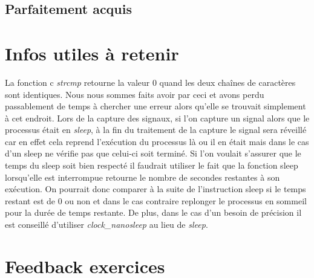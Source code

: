 \documentclass{ReportTemplate}
\begin{document}
\subsection{Parfaitement acquis}

\section{Infos utiles à retenir}
La fonction c \textit{strcmp} retourne la valeur 0 quand les deux chaînes de
caractères sont identiques. Nous nous sommes faits avoir par ceci et avons perdu
passablement de temps à chercher une erreur alors qu'elle se trouvait simplement
à cet endroit.\newline
Lors de la capture des signaux, si l'on capture un signal alors que le processus
était en \textit{sleep}, à la fin du traitement de la capture le signal sera
réveillé car en effet cela reprend l'exécution du processus là ou il en était
mais dans le cas d'un sleep ne vérifie pas que celui-ci soit terminé. Si l'on
voulait s'assurer que le temps du sleep soit bien respecté il faudrait utiliser
le fait que la fonction sleep lorsqu'elle est interrompue retourne le nombre de
secondes restantes à son exécution. On pourrait donc comparer à la suite de
l'instruction sleep si le temps restant est de 0 ou non et dans le cas contraire
replonger le processus en sommeil pour la durée de temps restante. De plus, dans
le cas d'un besoin de précision il est conseillé d'utiliser \textit{clock\_nanosleep} au lieu de \textit{sleep}.

\section{Feedback exercices}
\end{document}
